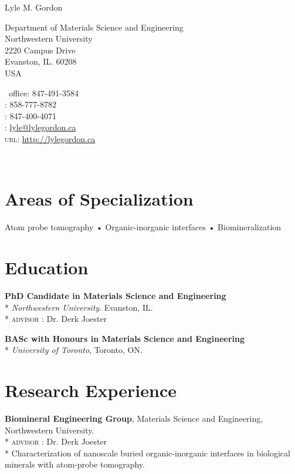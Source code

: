 \setlength\parindent{0cm}
{\LARGE Lyle M. Gordon}\\[0.6cm]

\noindent\begin{minipage}[t]{0.6\textwidth}
Department of Materials Science and Engineering\\
Northwestern University\\
2220 Campus Drive\\
Evanston, IL. 60208\\
USA
\end{minipage}%
\hfill
\begin{minipage}[t]{0.4\textwidth}
\Telefon \ {\small{office}}: 847-491-3584\\
: 858-777-8782\\
: 847-400-4071\\
\Letter: \href{mailto:lyle@lylegordon.ca}{lyle@lylegordon.ca}\\
\textsc{url}: \href{http://lylegordon.ca}{http://lylegordon.ca}
\end{minipage}\\

\section*{\large{Areas of Specialization}}
Atom probe tomography • Organic-inorganic interfaces • Biomineralization

\section*{Education}
\textbf{PhD Candidate in Materials Science and Engineering}\\*
\begingroup\setlength{\parskip}{0.2cm}
\emph{Northwestern University}. Evanston, IL.\\*
\textsc{advisor} : Dr. Derk Joester

\textbf{BASc with Honours in Materials Science and Engineering}\\*
\emph{University of Toronto}, Toronto, ON.
\endgroup

\section*{Research Experience}
\textbf{Biomineral Engineering Group}, Materials Science and Engineering, Northwestern University.\\*
\begingroup\setlength{\parskip}{0.2cm}
\textsc{advisor} : Dr. Derk Joester\\*
Characterization of nanoscale buried organic-inorganic interfaces in biological minerals with atom-probe tomography.

